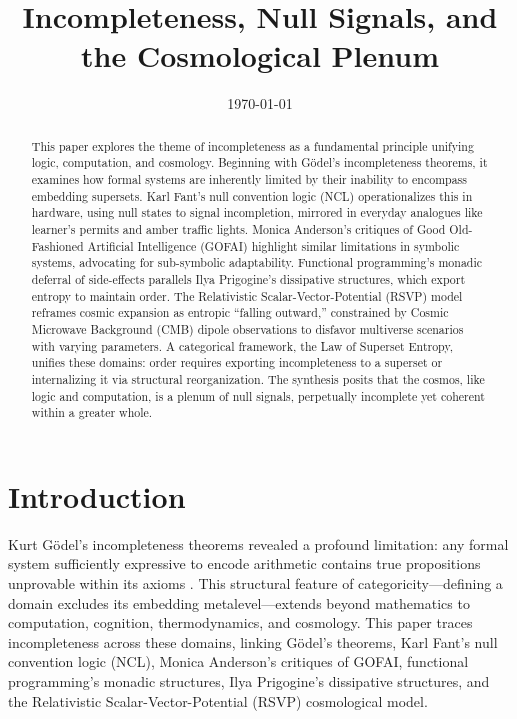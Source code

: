 \documentclass{article}
\begin{document}
\title{Incompleteness, Null Signals, and the Cosmological Plenum}
\author{}
\date{\today}
\maketitle

\begin{abstract}
This paper explores the theme of incompleteness as a fundamental principle unifying logic, computation, and cosmology. Beginning with Gödel's incompleteness theorems, it examines how formal systems are inherently limited by their inability to encompass embedding supersets. Karl Fant's null convention logic (NCL) operationalizes this in hardware, using null states to signal incompletion, mirrored in everyday analogues like learner's permits and amber traffic lights. Monica Anderson's critiques of Good Old-Fashioned Artificial Intelligence (GOFAI) highlight similar limitations in symbolic systems, advocating for sub-symbolic adaptability. Functional programming's monadic deferral of side-effects parallels Ilya Prigogine's dissipative structures, which export entropy to maintain order. The Relativistic Scalar-Vector-Potential (RSVP) model reframes cosmic expansion as entropic ``falling outward,'' constrained by Cosmic Microwave Background (CMB) dipole observations to disfavor multiverse scenarios with varying parameters. A categorical framework, the Law of Superset Entropy, unifies these domains: order requires exporting incompleteness to a superset or internalizing it via structural reorganization. The synthesis posits that the cosmos, like logic and computation, is a plenum of null signals, perpetually incomplete yet coherent within a greater whole.
\end{abstract}

\section{Introduction}
Kurt Gödel's incompleteness theorems revealed a profound limitation: any formal system sufficiently expressive to encode arithmetic contains true propositions unprovable within its axioms \citep{godel1931}. This structural feature of categoricity—defining a domain excludes its embedding metalevel—extends beyond mathematics to computation, cognition, thermodynamics, and cosmology. This paper traces incompleteness across these domains, linking Gödel's theorems, Karl Fant's null convention logic (NCL), Monica Anderson's critiques of GOFAI, functional programming's monadic structures, Ilya Prigogine's dissipative structures, and the Relativistic Scalar-Vector-Potential (RSVP) cosmological model.
\end{document}
